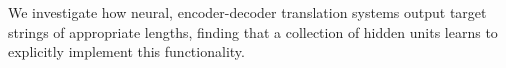 We investigate how neural, encoder-decoder translation systems output target strings of appropriate lengths, finding that a collection of hidden units learns to explicitly implement this functionality.
